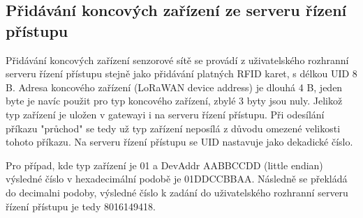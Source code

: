 \subsection{Přidávání koncových zařízení ze serveru řízení přístupu}
Přidávání koncových zařízení senzorové sítě se provádí z uživatelského rozhranní serveru řízení přístupu stejně jako přidávání platných RFID karet, s délkou UID 8 B.
Adresa koncového zařízení (LoRaWAN device address) je dlouhá 4 B, jeden byte je navíc použit pro typ koncového zařízení, zbylé 3 byty jsou nuly.
Jelikož typ zařízení je uložen v gatewayi i na serveru řízení přístupu. Při odesílání příkazu "průchod" se tedy už typ zařízení neposílá z důvodu omezené velikosti tohoto příkazu.
Na serveru řízení přístupu se UID nastavuje jako dekadické číslo.

Pro případ, kde typ zařízení je 01 a DevAddr AABBCCDD (little endian) výsledné číslo v hexadecimální podobě je 01DDCCBBAA. Následně se překládá do decimalni podoby, výsledné číslo k zadání do uživatelského rozhranní serveru řízení přístupu je tedy 8016149418.







